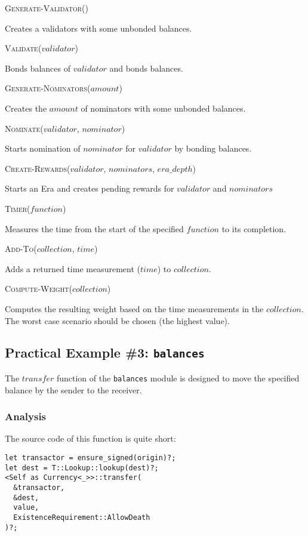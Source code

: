 \documentclass[11pt,a4paper]{article}
\newcommand{\SubItem}[1]{
    {\setlength\itemindent{15pt} \item[-] #1}
}
\begin{document}
\begin{itemize}
  \item \textsc{Generate-Validator()}
  \SubItem{Creates a validators with some unbonded balances.}
  \item \textsc{Validate($validator$)}
  \SubItem{Bonds balances of $validator$ and bonds balances.}
  \item \textsc{Generate-Nominators($amount$)}
  \SubItem{Creates the $amount$ of nominators with some unbonded balances.}
  \item \textsc{Nominate($validator$, $nominator$)}
  \SubItem{Starts nomination of $nominator$ for $validator$ by bonding balances.}
  \item \textsc{Create-Rewards($validator$, $nominators$, $era\_depth$)}
  \SubItem{Starts an Era and creates pending rewards for $validator$ and $nominators$}
  \item \textsc{Timer($function$)}
  \SubItem{Measures the time from the start of the specified $function$ to its
  completion.}
  \item \textsc{Add-To($collection$, $time$)}
  \SubItem{Adds a returned time measurement ($time$) to $collection$.}
  \item \textsc{Compute-Weight($collection$)}
  \SubItem{Computes the resulting weight based on the time measurements in the
  $collection$. The worst case scenario should be chosen (the highest value).}
\end{itemize}

\subsection{Practical Example \#3: \texttt{balances}}

The $transfer$ function of the \texttt{balances} module is designed to move the specified balance by the sender to the receiver.

\subsubsection{Analysis}

The source code of this function is quite short:

\begin{verbatim}
let transactor = ensure_signed(origin)?;
let dest = T::Lookup::lookup(dest)?;
<Self as Currency<_>>::transfer(
  &transactor,
  &dest,
  value,
  ExistenceRequirement::AllowDeath
)?;
\end{verbatim}
\end{document}
